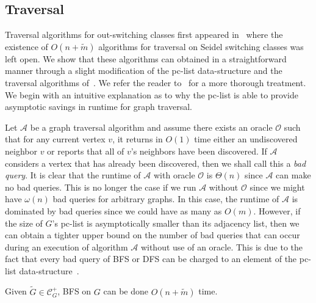 \documentclass{llncs}
\begin{document}
\subsection{Traversal}

Traversal algorithms for out-switching classes first appeared in~\cite{DahlhausGM02} where the existence of $O(n+\widetilde{m})$ algorithms for traversal on Seidel switching classes was left open.  We show that these algorithms can obtained in a straightforward manner through a slight modification of the pc-list data-structure and the traversal algorithms of~\cite{DahlhausGM02,LindzeyO13}.
 We refer the reader to~\cite{DahlhausGM02,LindzeyO13} for a more thorough treatment.  We begin with an intuitive explanation as to why the pc-list is able to provide asymptotic savings in runtime for graph traversal.

Let $\mathcal{A}$ be a graph traversal algorithm and assume there exists an oracle $\mathcal{O}$ such that for any current vertex $v$, it returns in $O(1)$ time either an undiscovered neighbor $v$ or reports that all of $v$'s neighbors have been discovered.  If $\mathcal{A}$ considers a vertex that has already been discovered, then we shall call this a \emph{bad query}. It is clear that the runtime of $\mathcal{A}$ with oracle $\mathcal{O}$ is $\Theta(n)$ since $\mathcal{A}$ can make no bad queries.  This is no longer the case if we run $\mathcal{A}$ without $\mathcal{O}$ since we might have $\omega(n)$ bad queries for arbitrary graphs. In this case, the runtime of $\mathcal{A}$ is dominated by bad queries since we could have as many as $O(m)$.  However, if the size of $G$'s pc-list is asymptotically smaller than its adjacency list, then we can obtain a tighter upper bound on the number of bad queries that can occur during an execution of algorithm $\mathcal{A}$ without use of an oracle.  This is due to the fact that every bad query of BFS or DFS can be charged to an element of the pc-list data-structure~\cite{DahlhausGM02,LindzeyO13}.

\begin{theorem}
\cite{DahlhausGM02} Given $\widetilde{G} \in \mathcal{C}^+_G$, BFS on $G$ can be done $O(n+\widetilde{m})$ time.
\end{theorem}
\end{document}
